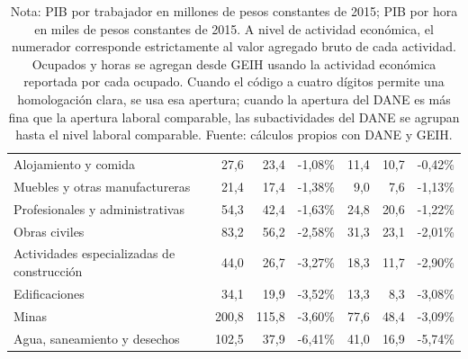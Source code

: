 \begin{table}[H]
\begin{tabular}{p{}rrrrrr}
Alojamiento y comida & 27,6 & 23,4 & -1,08\% & 11,4 & 10,7 & -0,42\% \\
Muebles y otras manufactureras & 21,4 & 17,4 & -1,38\% & 9,0 & 7,6 & -1,13\% \\
Profesionales y administrativas & 54,3 & 42,4 & -1,63\% & 24,8 & 20,6 & -1,22\% \\
Obras civiles & 83,2 & 56,2 & -2,58\% & 31,3 & 23,1 & -2,01\% \\
Actividades especializadas de construcción & 44,0 & 26,7 & -3,27\% & 18,3 & 11,7 & -2,90\% \\
Edificaciones & 34,1 & 19,9 & -3,52\% & 13,3 & 8,3 & -3,08\% \\
Minas & 200,8 & 115,8 & -3,60\% & 77,6 & 48,4 & -3,09\% \\
Agua, saneamiento y desechos & 102,5 & 37,9 & -6,41\% & 41,0 & 16,9 & -5,74\% \\
\bottomrule
\end{tabular}
\caption*{\footnotesize Nota: PIB por trabajador en millones de pesos constantes de 2015; PIB por hora en miles de pesos constantes de 2015. A nivel de actividad económica, el numerador corresponde estrictamente al valor agregado bruto de cada actividad. Ocupados y horas se agregan desde GEIH usando la actividad económica reportada por cada ocupado. Cuando el código a cuatro dígitos permite una homologación clara, se usa esa apertura; cuando la apertura del DANE es más fina que la apertura laboral comparable, las subactividades del DANE se agrupan hasta el nivel laboral comparable. Fuente: cálculos propios con DANE y GEIH.}
\end{table}
